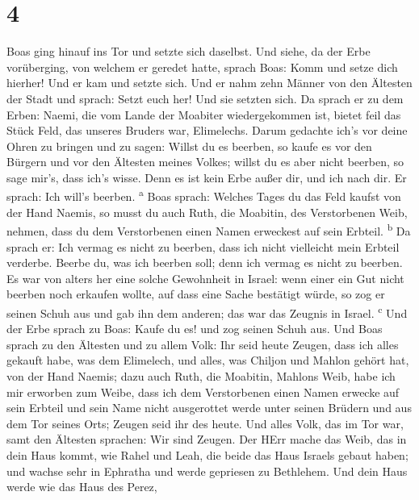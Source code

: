 \hypertarget{section-3}{%
\section{4}\label{section-3}}

 Boas ging hinauf ins Tor und setzte sich daselbst. Und
siehe, da der Erbe vorüberging, von welchem er geredet hatte, sprach
Boas: Komm und setze dich hierher! Und er kam und setzte sich.
 Und er nahm zehn Männer von den Ältesten der Stadt und
sprach: Setzt euch her! Und sie setzten sich.  Da sprach
er zu dem Erben: Naemi, die vom Lande der Moabiter wiedergekommen ist,
bietet feil das Stück Feld, das unseres Bruders war, Elimelechs.
 Darum gedachte ich's vor deine Ohren zu bringen und zu
sagen: Willst du es beerben, so kaufe es vor den Bürgern und vor den
Ältesten meines Volkes; willst du es aber nicht beerben, so sage mir's,
dass ich's wisse. Denn es ist kein Erbe außer dir, und ich nach dir. Er
sprach: Ich will's beerben. \textsuperscript{a}  Boas
sprach: Welches Tages du das Feld kaufst von der Hand Naemis, so musst
du auch Ruth, die Moabitin, des Verstorbenen Weib, nehmen, dass du dem
Verstorbenen einen Namen erweckest auf sein Erbteil. \textsuperscript{b}
 Da sprach er: Ich vermag es nicht zu beerben, dass ich
nicht vielleicht mein Erbteil verderbe. Beerbe du, was ich beerben soll;
denn ich vermag es nicht zu beerben.  Es war von alters
her eine solche Gewohnheit in Israel: wenn einer ein Gut nicht beerben
noch erkaufen wollte, auf dass eine Sache bestätigt würde, so zog er
seinen Schuh aus und gab ihn dem anderen; das war das Zeugnis in Israel.
\textsuperscript{c}  Und der Erbe sprach zu Boas: Kaufe du
es! und zog seinen Schuh aus.  Und Boas sprach zu den
Ältesten und zu allem Volk: Ihr seid heute Zeugen, dass ich alles
gekauft habe, was dem Elimelech, und alles, was Chiljon und Mahlon
gehört hat, von der Hand Naemis;  dazu auch Ruth, die
Moabitin, Mahlons Weib, habe ich mir erworben zum Weibe, dass ich dem
Verstorbenen einen Namen erwecke auf sein Erbteil und sein Name nicht
ausgerottet werde unter seinen Brüdern und aus dem Tor seines Orts;
Zeugen seid ihr des heute.  Und alles Volk, das im Tor
war, samt den Ältesten sprachen: Wir sind Zeugen. Der HErr mache das
Weib, das in dein Haus kommt, wie Rahel und Leah, die beide das Haus
Israels gebaut haben; und wachse sehr in Ephratha und werde gepriesen zu
Bethlehem.  Und dein Haus werde wie das Haus des Perez,
